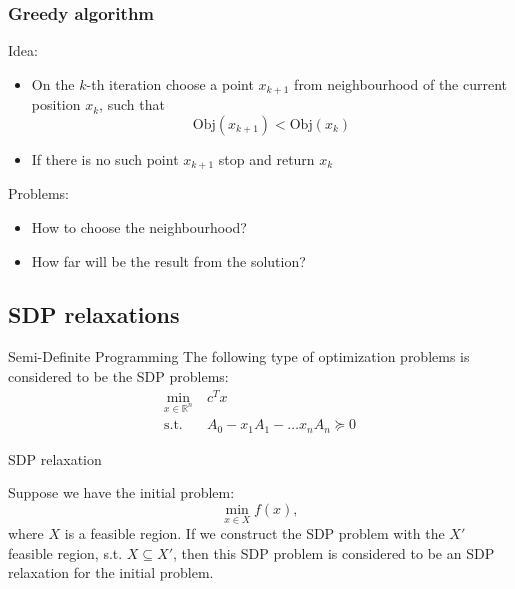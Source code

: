 \documentclass[10pt]{beamer}
\begin{document}
	\begin{frame}
		\frametitle{Greedy algorithm}
		
		{\Large Idea:}
		\begin{itemize}
			\item On the $k$-th iteration choose a point $x_{k+1}$ from neighbourhood 
			of the current position $x_k$, such that
			\[
				\text{Obj}(x_{k+1}) < \text{Obj}(x_k)
			\]
			\item If there is no such point $x_{k+1}$ stop and return $x_k$
		\end{itemize}
	
		\vspace{0.2in}
		{\Large Problems:}
		\begin{itemize}
			\item How to choose the neighbourhood?
			\item How far will be the result from the solution?
		\end{itemize}
	
	\end{frame}


    \subsection{SDP relaxations}

        \begin{frame}{Semi-Definite Programming}
            The following type of optimization problems is considered to be the SDP problems:
            \begin{align*}
                \min_{x \in \mathbb{R}^n} &~c^Tx\\
                \text{s.t.} &~A_0 - x_1A_1 - \dots x_nA_n \succeq 0
            \end{align*}
            
        \end{frame}
        
        \begin{frame}{SDP relaxation}
        
            Suppose we have the initial problem:
            \[
                \min_{x \in X} f(x),
            \]
            where $X$ is a feasible region. If we construct the SDP problem with the $X'$ feasible region, s.t. $X \subseteq X'$, then this SDP problem is considered to be an SDP relaxation for the initial problem.
            
            
        \end{frame}
	
\end{document}
